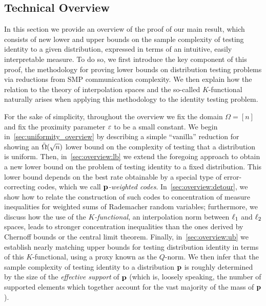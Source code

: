 \subsection{Technical Overview}
\label{sec:technical_overview}
In this section we provide an overview of the proof of our main result, which consists of new lower and upper bounds on the sample complexity of testing identity to a given distribution, expressed in terms of an intuitive, easily interpretable measure. To do so, we first introduce the key component of this proof, the methodology for proving lower bounds on distribution testing problems via reductions from SMP communication complexity. We then explain how the relation to the theory of interpolation spaces and the so-called $K$-functional naturally arises when applying this methodology to the identity testing problem.

 For the sake of simplicity, throughout the overview we fix the domain $\Omega = [n]$ and fix the proximity parameter $\eps$ to be a small constant. We begin in~\cref{sec:uniformity_overview} by describing a simple ``vanilla'' reduction for showing an $\tildeOmega{\sqrt{n}}$ lower bound on the complexity of testing that a distribution is uniform. Then, in~\cref{sec:overview:lb} we extend the foregoing approach to obtain a new lower bound on the problem of testing identity to a fixed distribution. This lower bound depends on the best rate obtainable by a special type of error-correcting codes, which we call \emph{$\p$-weighted codes}. In~\cref{sec:overview:detour}, we show how to relate the construction of such codes to concentration of measure inequalities for weighted sums of Rademacher random variables; furthermore, we discuss how the use of the \emph{$K$-functional}, an interpolation norm between $\lp[1]$ and $\lp[2]$ spaces, leads to stronger concentration inequalities than the ones derived by Chernoff bounds or the central limit theorem. Finally, in~\cref{sec:overview:ub} we establish nearly matching upper bounds for testing distribution identity in terms of this $K$-functional, using a proxy known as the $Q$-norm. We then infer that the sample complexity of testing identity to a distribution $\p$ is roughly determined by the size of the \emph{effective support} of $\p$ (which is, loosely speaking, the number of supported elements which together account for the vast majority of the mass of $\p$).

